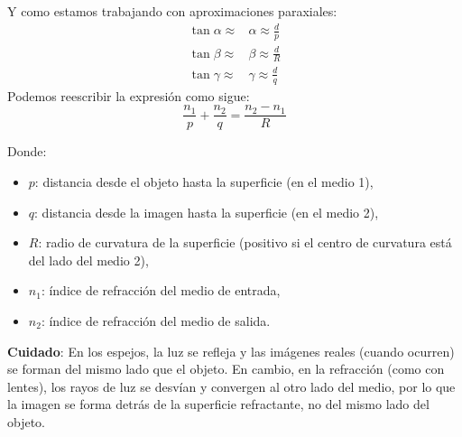 Y como estamos trabajando con aproximaciones paraxiales:
\begin{align*}
  \tan \alpha \approx &\alpha \approx \frac{d}{p} \\
  \tan \beta \approx &\beta \approx \frac{d}{R} \\
  \tan \gamma \approx &\gamma \approx \frac{d}{q}
\end{align*}
Podemos reescribir la expresión como sigue:
\begin{equation}
\frac{n_1}{p} + \frac{n_2}{q} = \frac{n_2 - n_1}{R}
\label{eq:refraction_spherical}
\end{equation}

Donde:
\begin{itemize}
  \item \(p\): distancia desde el objeto hasta la superficie (en el medio 1),
  \item \(q\): distancia desde la imagen hasta la superficie (en el medio 2),
  \item \(R\): radio de curvatura de la superficie (positivo si el centro de curvatura está del lado del medio 2),
  \item \(n_1\): índice de refracción del medio de entrada,
  \item \(n_2\): índice de refracción del medio de salida.
\end{itemize}

\begin{tcolorbox}[myconclusion]
  \textbf{Cuidado}: En los espejos, la luz se refleja y las imágenes reales (cuando ocurren) se forman del mismo lado que el objeto.
  En cambio, en la refracción (como con lentes), los rayos de luz se desvían y convergen al otro lado del medio, por lo que la imagen se forma detrás de la superficie refractante, no del mismo lado del objeto.
\end{tcolorbox}

